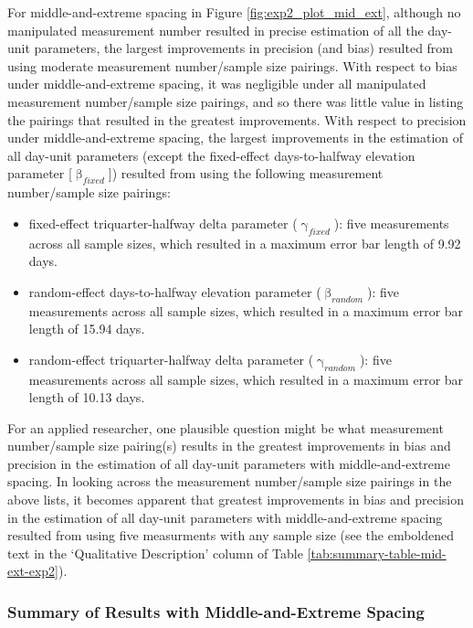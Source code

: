 \documentclass[
12pt, %
twoside,
english]{guelphthesis}
\begin{document}
For middle-and-extreme spacing in Figure \ref{fig:exp2_plot_mid_ext}, although no manipulated measurement number resulted in precise estimation of all the day-unit parameters, the largest improvements in precision (and bias) resulted from using moderate measurement number/sample size pairings. With respect to bias under middle-and-extreme spacing, it was negligible under all manipulated measurement number/sample size pairings, and so there was little value in listing the pairings that resulted in the greatest improvements. With respect to precision under middle-and-extreme spacing, the largest improvements in the estimation of all day-unit parameters (except the fixed-effect days-to-halfway elevation parameter {[}\(\upbeta_{fixed}\){]}) resulted from using the following measurement number/sample size pairings:
\begin{itemize}
\tightlist
\item
  fixed-effect triquarter-halfway delta parameter (\(\upgamma_{fixed}\)): five measurements across all sample sizes, which resulted in a maximum error bar length of 9.92 days.
\item
  random-effect days-to-halfway elevation parameter (\(\upbeta_{random}\)): five measurements across all sample sizes, which resulted in a maximum error bar length of 15.94 days.
\item
  random-effect triquarter-halfway delta parameter (\(\upgamma_{random}\)): five measurements across all sample sizes, which resulted in a maximum error bar length of 10.13 days.
\end{itemize}
For an applied researcher, one plausible question might be what measurement number/sample size pairing(s) results in the greatest improvements in bias and precision in the estimation of all day-unit parameters with middle-and-extreme spacing. In looking across the measurement number/sample size pairings in the above lists, it becomes apparent that greatest improvements in bias and precision in the estimation of all day-unit parameters with middle-and-extreme spacing resulted from using five measurments with any sample size (see the emboldened text in the `Qualitative Description' column of Table \ref{tab:summary-table-mid-ext-exp2}).

\hypertarget{summary-of-results-with-middle-and-extreme-spacing-1}{%
\subsubsection{Summary of Results with Middle-and-Extreme Spacing}\label{summary-of-results-with-middle-and-extreme-spacing-1}}
\end{document}
